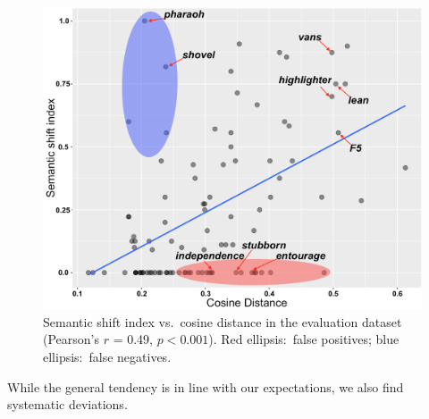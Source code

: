 

\begin{figure}[t]\centering
\includegraphics[width=\columnwidth]{images/cosine_distance_shift_index_annotated_3.png}
\caption{Semantic shift index vs.~cosine distance in the evaluation dataset (Pearson's $r$ = 0.49, $p< 0.001$). 
Red ellipsis:~false positives; blue ellipsis:~false negatives.
\label{fig:shift-cosine}}
\vspace*{-5pt}
\end{figure}

While the general tendency is in line with our expectations, we
also find systematic deviations. 

